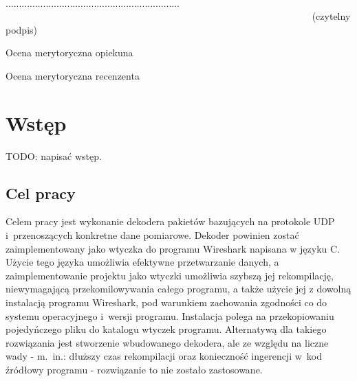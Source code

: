 \documentclass[a4paper, 12pt, twoside, openright]{article}
\begin{document}
\begin{center}

~~~~~~~~~~~~~~~~~~~~~~~~~~~~~~~~~~~~~~~~~~~~~~~~~~~~~~~~~~~~~~~~~ 
................................................................. \\
~~~~~~~~~~~~~~~~~~~~~~~~~~~~~~~~~~~~~~~~~~~~~~~~~~~~~~~~~~~~~~~  {\sf (czytelny podpis)} \\

\end{center}



\newpage
\linespread{1.3}
\selectfont

\hspace*{\fill}\large{Ocena merytoryczna opiekuna}

\vspace{85mm}

\newpage
\linespread{1.3}
\selectfont

\hspace*{\fill}\large{Ocena merytoryczna recenzenta}

\vspace{85mm}


\newpage
\tableofcontents


\newpage
\section{Wstęp}

TODO: napisać wstęp.


	\newpage
	\subsection{Cel pracy}

	\indent\par
	Celem pracy jest wykonanie dekodera pakietów bazujących na protokole UDP i~przenoszących konkretne dane pomiarowe.
	Dekoder powinien zostać zaimplementowany jako wtyczka do programu Wireshark napisana w języku C. Użycie tego języka umożliwia efektywne
	przetwarzanie danych, a zaimplementowanie projektu jako wtyczki umożliwia szybszą jej rekompilację,
	niewymagającą przekomilowywania całego programu, a także użycie jej  z dowolną instalacją programu Wireshark,
	pod warunkiem zachowania zgodności co do systemu operacyjnego i~wersji programu. Instalacja polega na przekopiowaniu
	pojedyńczego pliku do katalogu wtyczek programu. Alternatywą dla takiego rozwiązania jest stworzenie wbudowanego dekodera,
	ale ze względu na liczne wady - m.~in.: dłuższy czas rekompilacji oraz konieczność ingerencji w~kod źródłowy programu - rozwiązanie
	to nie zostało zastosowane.
\end{document}
